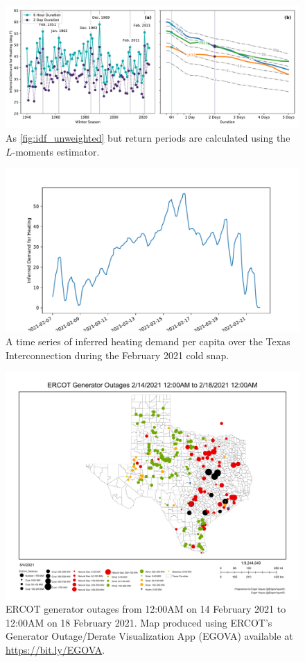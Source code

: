 \documentclass[12pt]{iopart}
\begin{document}
\begin{figure}
  \centering
  \includegraphics[width=\textwidth]{ERCOT_HDD_IDF_plotpos_unweighted.pdf}
  \caption{
    As \cref{fig:idf_unweighted} but return periods are calculated using the $L$-moments estimator.
  }\label{fig:idf_lmoments_unweighted}
\end{figure}

\begin{figure}
  \centering
  \includegraphics[width=\textwidth]{HDD_pop_weighted_ts.pdf}
  \caption{
    A time series of inferred heating demand per capita over the Texas Interconnection during the February 2021 cold snap.
  }\label{fig:hdd_ts}
\end{figure}

\begin{figure}
  \includegraphics[width=\textwidth]{EGOVA.pdf}
  \caption{
    ERCOT generator outages from 12:00AM on 14 February 2021 to 12:00AM on 18 February 2021.
    Map produced using ERCOT's Generator Outage/Derate Visualization App (EGOVA) available at \url{https://bit.ly/EGOVA}.
  }\label{fig:egova}
\end{figure}
\end{document}
